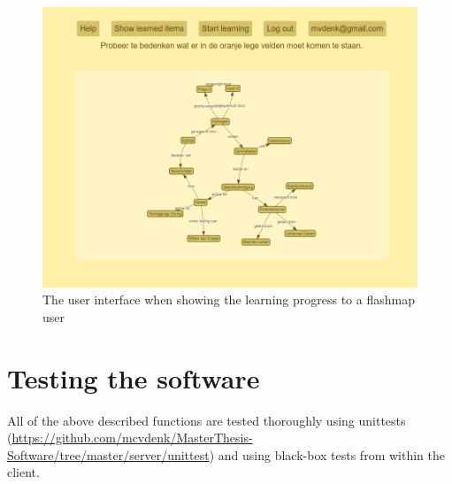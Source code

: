 \begin{figure}
    \centering
    \includegraphics[width=.8\textwidth]{img/ui_fm_learnprogress.png}
    \caption{The user interface when showing the learning progress to a flashmap user}
    \label{fig:ui_fm_learnprogress}
\end{figure}

\section{Testing the software}

All of the above described functions are tested thoroughly using unittests (\url{https://github.com/mcvdenk/MasterThesis-Software/tree/master/server/unittest}) and using black-box tests from within the client.
